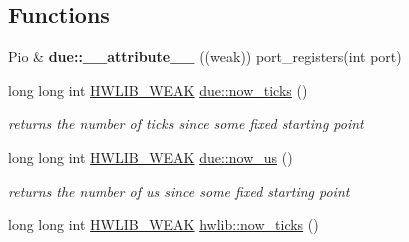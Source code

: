 \subsection*{Functions}
\begin{DoxyCompactItemize}
\item 
Pio \& {\bfseries due\+::\+\_\+\+\_\+attribute\+\_\+\+\_\+} ((weak)) port\+\_\+registers(int port)\hypertarget{namespacedue_a691468d1eaea9eb36a06b94e7c27d6fa}{}\label{namespacedue_a691468d1eaea9eb36a06b94e7c27d6fa}

\item 
long long int \hyperlink{hwlib-defines_8hpp_a04be4340016df60d6636c1d1c6d94fc9}{H\+W\+L\+I\+B\+\_\+\+W\+E\+AK} \hyperlink{namespacedue_aed372aa18d1261d874f74642952d4b53}{due\+::now\+\_\+ticks} ()\hypertarget{namespacedue_aed372aa18d1261d874f74642952d4b53}{}\label{namespacedue_aed372aa18d1261d874f74642952d4b53}

\begin{DoxyCompactList}\small\item\em returns the number of ticks since some fixed starting point \end{DoxyCompactList}\item 
long long int \hyperlink{hwlib-defines_8hpp_a04be4340016df60d6636c1d1c6d94fc9}{H\+W\+L\+I\+B\+\_\+\+W\+E\+AK} \hyperlink{namespacedue_a763b16adccc73515e1d463402e05fd52}{due\+::now\+\_\+us} ()\hypertarget{namespacedue_a763b16adccc73515e1d463402e05fd52}{}\label{namespacedue_a763b16adccc73515e1d463402e05fd52}

\begin{DoxyCompactList}\small\item\em returns the number of us since some fixed starting point \end{DoxyCompactList}\item 
long long int \hyperlink{hwlib-defines_8hpp_a04be4340016df60d6636c1d1c6d94fc9}{H\+W\+L\+I\+B\+\_\+\+W\+E\+AK} \hyperlink{hwlib-due_8hpp_a67d9fb94cfe33623b7cdb37620b2e3ae}{hwlib\+::now\+\_\+ticks} ()\hypertarget{hwlib-due_8hpp_a67d9fb94cfe33623b7cdb37620b2e3ae}{}\label{hwlib-due_8hpp_a67d9fb94cfe33623b7cdb37620b2e3ae}


\end{DoxyCompactItemize}
